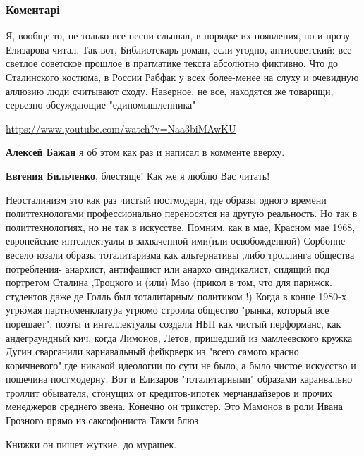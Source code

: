  
 
 
 
 
\subsubsection{Коментарі}

\begin{itemize} %

Я, вообще-то, не только все песни слышал, в порядке их появления, но и прозу
Елизарова читал. Так вот, Библиотекарь роман, если угодно, антисоветский: все
светлое советское прошлое в прагматике текста абсолютно фиктивно. Что до
Сталинского костюма, в России Рабфак у всех более-менее на слуху и очевидную
аллюзию люди считывают сходу. Наверное, не все, находятся же товарищи, серьезно
обсуждающие "единомышленника" 

\url{https://www.youtube.com/watch?v=Naa3biMAwKU}

\textbf{Алексей Бажан} я об этом как раз и написал в комменте вверху.

\textbf{Евгения Бильченко}, блестяще!
Как же я люблю Вас читать!


Неосталинизм это как раз чистый постмодерн, где образы одного времени
политтехнологами профессионально переносятся на другую реальность. Но так в
политтехнологиях, но не так в искусстве. Помним, как в мае, Красном мае 1968,
европейские интеллектуалы в захваченной ими(или освобожденной) Сорбонне весело
юзали образы тоталитаризма как альтернативы ,либо троллинга общества
потребления- анархист, антифашист или анархо синдикалист, сидящий под портретом
Сталина ,Троцкого и (или) Мао (прикол в том, что для парижск. студентов даже де
Голль был тоталитарным политиком !) Когда в конце 1980-х угрюмая
партноменклатура угрюмо строила общество "рынка, который все порешает", поэты и
интеллектуалы создали НБП как чистый перформанс, как андеграундный кич, когда
Лимонов, Летов, пришедший из мамлеевского кружка Дугин сварганили карнавальный
фейкрверк из "всего самого красно коричневого",где никакой идеологии по сути не
было, а было чистое искусство и пощечина постмодерну. Вот и Елизаров
"тоталитарными" образами каранвально троллит обывателя, стонущих от
кредитов-ипотек мерчандайзеров и прочих менеджеров среднего звена. Конечно он
трикстер. Это Мамонов в роли Ивана Грозного прямо из саксофониста Такси блюз

Книжки он пишет жуткие, до мурашек.

\end{itemize} %
